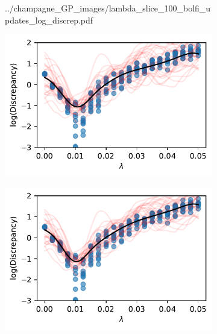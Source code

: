 \begin{figure}[htbp]
\begin{subfigure}[b]{0.5\textwidth}
{            ../champagne_GP_images/lambda_slice_100_bolfi_updates_log_discrep.pdf
        }
    \end{subfigure}
    \hfill%
    \begin{subfigure}[b]{0.5\textwidth}
        \centering
        \includegraphics[width=\textwidth]{
            ../champagne_GP_images/lambda_slice_200_bolfi_updates_log_discrep.pdf
        }
    \end{subfigure}%
    \hfill%
    \begin{subfigure}[b]{0.5\textwidth}
        \centering
        \includegraphics[width=\textwidth]{
            ../champagne_GP_images/lambda_slice_300_bolfi_updates_log_discrep.pdf
        }
    \end{subfigure}%
    \hfill%
    \begin{subfigure}[b]{0.5\textwidth}
        \centering

\end{subfigure}
\end{figure}

